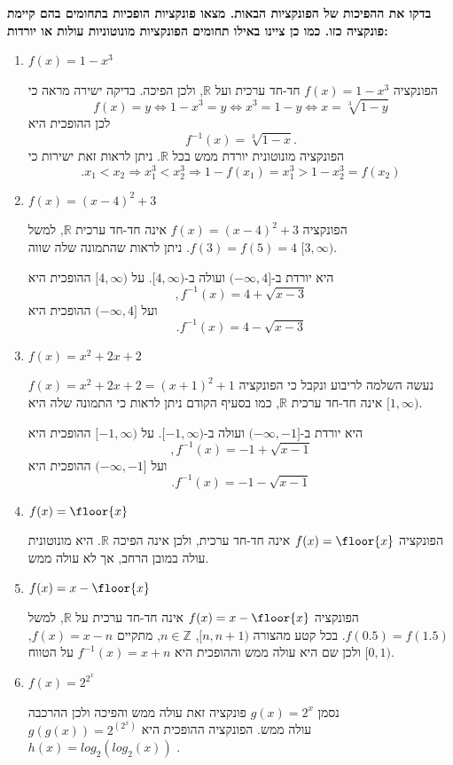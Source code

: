 \textbf{בדקו את ההפיכות של הפונקציות הבאות. מצאו פונקציות הופכיות בתחומים בהם קיימת פונקציה כזו.
כמו כן ציינו באילו תחומים הפונקציות מונוטוניות עולות או יורדות:}
\begin{enumerate}
\item
$f(x)=1-x^3$
\begin{solbox}
הפונקציה
$f(x)=1-x^3$
חד-חד ערכית ועל
$\mathbb{R}$,
ולכן הפיכה.
בדיקה ישירה מראה כי
$$f(x)=y \iff 1-x^3=y \iff x^3=1-y \iff x=\sqrt[3]{1-y}$$
לכן
ההופכית היא
\[
f^{-1}(x)=\sqrt[3]{1-x}.
\]
הפונקציה מונוטונית יורדת ממש בכל $\mathbb{R}$.
ניתן לראות זאת ישירות כי
$$.x_1<x_2\Rightarrow x_1^3<x_2^3\Rightarrow 1-f(x_1)=x_1^3> 1-x_2^3=f(x_2)$$
\end{solbox}
\item
$f(x)=(x-4)^2+3$
\begin{solbox}
הפונקציה $f(x)=(x-4)^2+3$ אינה חד-חד ערכית  $\mathbb{R}$,
למשל
$f(3)=f(5)=4$.
ניתן לראות שהתמונה שלה שווה
$[3,\infty)$.

היא יורדת ב-$(-\infty,4]$ ועולה ב-$[4,\infty)$. על $[4,\infty)$ ההופכית היא
\[
,f^{-1}(x)=4+\sqrt{x-3}
\]
ועל $(-\infty,4]$ ההופכית היא
\[
.f^{-1}(x)=4-\sqrt{x-3}
\]
\end{solbox}
\item
$f(x)=x^2+2x+2$
\begin{solbox}
נעשה השלמה לריבוע ונקבל כי
הפונקציה
$f(x)=x^2+2x+2=(x+1)^2+1$
אינה חד-חד ערכית
$\mathbb{R}$,
כמו בסעיף הקודם ניתן לראות כי התמונה שלה היא
$[1,\infty)$.

היא יורדת ב-$(-\infty,-1]$
ועולה ב-$[-1,\infty)$. על $[-1,\infty)$ ההופכית היא
\[
,f^{-1}(x)=-1+\sqrt{x-1}
\]
ועל $(-\infty,-1]$ ההופכית היא
\[
.f^{-1}(x)=-1-\sqrt{x-1}
\]
\end{solbox}
\item
$f(x)=\floor{x}$
\begin{solbox}
הפונקציה
$f(x)=\floor{x}$
אינה חד-חד ערכית, ולכן אינה הפיכה  $\mathbb{R}$. היא מונוטונית עולה במובן הרחב, אך לא עולה ממש.
\end{solbox}

\item
$f(x)=x-\floor{x}$
\hint{בכל קטע מהצורה $[n,n+1)$ עם $n$ שלם, כתבו את $f$ בלי סימן הערך השלם.}
\begin{solbox}
הפונקציה $f(x)=x-\floor{x}$ אינה חד-חד ערכית על $\mathbb{R}$, למשל $f(0.5)=f(1.5)$. בכל קטע מהצורה $[n,n+1)$, $n\in\mathbb{Z}$, מתקיים $f(x)=x-n$,
ולכן שם היא עולה ממש וההופכית היא
$f^{-1}(x)=x+n$
על הטווח
$[0,1)$.
\end{solbox}
\item
$f(x)=2^{2^x}$
\begin{solbox}
נסמן
$g(x)=2^x$
פונקציה זאת עולה ממש והפיכה ולכן ההרכבה
\\
$g(g(x))=2^{(2^x)}$
עולה ממש.
הפונקציה ההופכית היא
$h(x)=log_2(log_2(x))$
.
\end{solbox}
\eMs
\end{enumerate}
